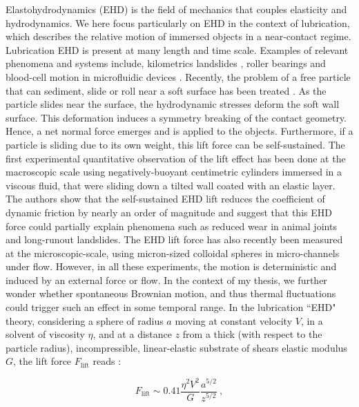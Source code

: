 Elastohydrodynamics (\gls{EHD}) is the field of mechanics that couples elasticity and hydrodynamics. We here focus particularly on \gls{EHD} in the context of lubrication, which describes the relative motion of immersed objects in a near-contact regime. Lubrication \gls{EHD} is present at many length and time scale. Examples of relevant phenomena and systems include, kilometrics landslides \cite{campbell_self-lubrication_1989}, roller bearings \cite{hamrock_fundamentals_2004} and blood-cell motion in microfluidic devices \cite{byun_characterizing_2013, higgins_sickle_2007, cohen_hydrodynamics_2013}. Recently, the problem of a free particle that can sediment, slide or roll near a soft surface has been treated  \cite{sekimoto_mechanism_1993,skotheim_soft_2004,skotheim_soft_2005,beaucourt_optimal_2004,salez_elastohydrodynamics_2015,bertin_soft-lubrication_2021}. As the particle slides near the surface, the hydrodynamic stresses deform the soft wall surface. This deformation induces a symmetry breaking of the contact geometry. Hence, a net normal force emerges and is applied to the objects. Furthermore, if a particle is sliding due to its own weight, this lift force can be self-sustained. The first experimental quantitative observation of the lift effect has been done at the macroscopic scale using negatively-buoyant centimetric cylinders immersed in a viscous fluid, that were sliding down a tilted wall coated with an elastic layer. The authors show that the self-sustained \gls{EHD} lift reduces the coefficient of dynamic friction by nearly an order of magnitude and suggest that this \gls{EHD} force could partially explain phenomena such as reduced wear in animal joints and long-runout landslides. The \gls{EHD} lift force has also recently been measured at the microscopic-scale, using micron-sized colloidal spheres in micro-channels under flow. However, in all these experiments,  the motion is deterministic and induced by an external force or flow. In the context of my thesis, we further wonder whether spontaneous Brownian motion, and thus thermal fluctuations could trigger such an effect in some temporal range. In the lubrication ``\gls{EHD}" theory, considering a sphere of radius $a$ moving at constant velocity $V$, in a solvent of viscosity $\eta$, and at a distance $z$ from a thick (with respect to the particle radius), incompressible, linear-elastic substrate of shears elastic modulus $G$, the lift force $F_\mathrm{lift}$ reads \cite{skotheim_soft_2004}:

\begin{equation}
	F_\mathrm{lift} \sim 0.41\frac{\eta^2 V^2}{G} \frac{a^{5/2}}{z^{5/2}} ~,
	\label{Eq.lift_deter}
\end{equation}

